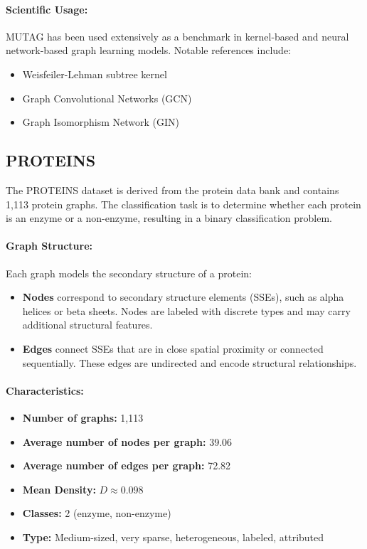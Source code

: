 \documentclass[11pt,a4paper]{article}
\begin{document}
\paragraph{Scientific Usage:}
MUTAG has been used extensively as a benchmark in kernel-based and neural network-based graph learning models. Notable references include:
\begin{itemize}
	\item Weisfeiler-Lehman subtree kernel \cite{shervashidze2011weisfeiler}
	\item Graph Convolutional Networks (GCN) \cite{kipf2017semi}
	\item Graph Isomorphism Network (GIN) \cite{xu2019powerful}
\end{itemize}

\subsection*{PROTEINS}

The PROTEINS dataset is derived from the protein data bank and contains 1,113 protein graphs. The classification task is to determine whether each protein is an enzyme or a non-enzyme, resulting in a binary classification problem.

\paragraph{Graph Structure:}
Each graph models the secondary structure of a protein:
\begin{itemize}
	\item \textbf{Nodes} correspond to secondary structure elements (SSEs), such as alpha helices or beta sheets. Nodes are labeled with discrete types and may carry additional structural features.
	\item \textbf{Edges} connect SSEs that are in close spatial proximity or connected sequentially. These edges are undirected and encode structural relationships.
\end{itemize}

\paragraph{Characteristics:}
\begin{itemize}
	\item \textbf{Number of graphs:} 1,113
	\item \textbf{Average number of nodes per graph:} 39.06
	\item \textbf{Average number of edges per graph:} 72.82
		\item \textbf{Mean Density:} $D \approx 0.098$
	\item \textbf{Classes:} 2 (enzyme, non-enzyme)
	\item \textbf{Type:} Medium-sized, very sparse, heterogeneous, labeled, attributed
\end{itemize}
\end{document}
